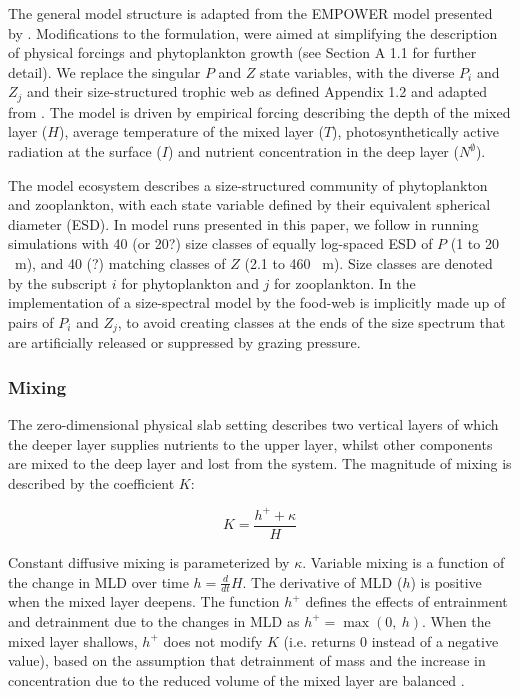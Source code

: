 \documentclass[journal abbreviations, manuscript]{copernicus}
\begin{document}
The general model structure is adapted from the EMPOWER model presented by \citet{Anderson2015c}. Modifications to the formulation, were aimed at simplifying the description of physical forcings and phytoplankton growth (see Section A 1.1 for further detail). We replace the singular $P$ and $Z$ state variables, with the diverse $P_i$ and $Z_j$ and their size-structured trophic web as defined Appendix 1.2 and adapted from \citet{Banas2011b}. The model is driven by empirical forcing describing the depth of the mixed layer ($H$), average temperature of the mixed layer ($T$), photosynthetically active radiation at the surface ($I$) and nutrient concentration in the deep layer ($N^\emptyset$).

The model ecosystem describes a size-structured community of phytoplankton and zooplankton, with each state variable defined by their equivalent spherical diameter (ESD). In model runs presented in this paper, we follow \citet{Banas2011b} in running simulations with 40 (or 20?) size classes of equally log-spaced ESD of $P$ (1 to 20 \unit{\mu m}), and 40 (?)  matching classes of $Z$ (2.1 to 460  \unit{\mu m}). 
Size classes are denoted by the subscript $i$ for phytoplankton and $j$ for zooplankton. In the implementation of a size-spectral model by \citeauthor{Banas2011b} the food-web is implicitly made up of pairs of $P_i$ and $Z_j$, to avoid creating classes at the ends of the size spectrum that are artificially released or suppressed by grazing pressure.



\subsubsection{Mixing}
The zero-dimensional physical slab setting describes two vertical layers of which the deeper layer supplies nutrients to the upper layer, whilst other components are mixed to the deep layer and lost from the system.
The magnitude of mixing is described by the coefficient $K$:

\begin{equation}
    K = \frac{h^{+} + \kappa}{H}
\end{equation}

Constant diffusive mixing is parameterized by $\kappa$. Variable mixing is a function of the change in MLD over time $h = \frac{d}{d t} H$. The derivative of MLD ($h$) is positive when the mixed layer deepens. The function $h^{+}$ defines the effects of entrainment and detrainment due to the changes in MLD as $h^{+} = \max(0, \ h)$. When the mixed layer shallows, $h^{+}$ does not modify $K$ (i.e. returns 0 instead of a negative value), based on the assumption that detrainment of mass and the increase in concentration due to the reduced volume of the mixed layer are balanced \citep{Evans1985ACycles}. 
\end{document}

